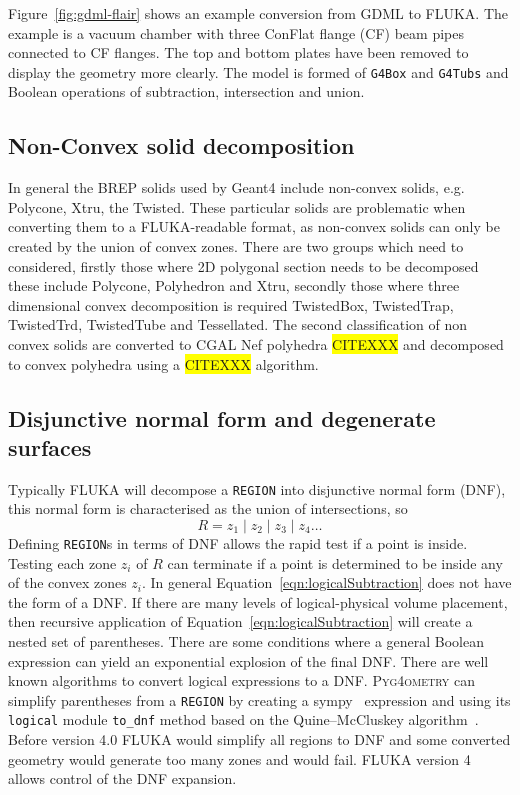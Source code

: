 \documentclass[final,5p,times,twocolumn]{elsarticle}
\newcommand{\PYGEOMETRY}{\textsc{Pyg4ometry}}
\begin{document}
Figure~\ref{fig:gdml-flair} shows an example conversion from GDML to FLUKA. The example is a 
vacuum chamber with three ConFlat flange (CF) beam pipes connected to CF flanges. The top and bottom plates 
have been removed to display the geometry more clearly. The model is formed of \verb|G4Box| and
\verb|G4Tubs| and Boolean operations of subtraction, intersection and union.

\subsection{Non-Convex solid decomposition}
In general the BREP solids used by Geant4 include non-convex solids, e.g. Polycone, Xtru, the Twisted.  These 
particular solids are problematic when converting them to a FLUKA-readable format, as non-convex solids 
can only be created by the union of convex zones. There are two groups which need to considered, firstly those 
where 2D polygonal section needs to be decomposed these include Polycone, Polyhedron and Xtru, secondly 
those where three dimensional convex decomposition is required  TwistedBox, TwistedTrap, TwistedTrd, 
TwistedTube and Tessellated. The second classification of non convex solids are converted to CGAL 
Nef polyhedra \colorbox{yellow}{CITEXXX} and decomposed to convex polyhedra using a 
\colorbox{yellow}{CITEXXX} algorithm. 

\subsection{Disjunctive normal form and degenerate surfaces}
Typically FLUKA will decompose a \verb|REGION| into disjunctive normal form (DNF), this normal form is 
characterised as the union of intersections, so 
\begin{equation}
R = z_1 \; | \;z_2\;  | \; z_3 	\; | \; z_4 \dots
\end{equation}
Defining \verb|REGION|s in terms of DNF allows the rapid test if a point is inside. Testing each zone 
$z_i$ of $R$ can terminate if a point is determined to be inside any of the convex zones $z_i$. In general 
Equation~\ref{eqn:logicalSubtraction} does not have the form of a DNF. If there are many levels of logical-physical volume 
placement, then recursive application of  Equation~\ref{eqn:logicalSubtraction} will create a nested set of 
parentheses. There are some conditions where a general Boolean expression can yield an exponential 
explosion of the final DNF. There are well known algorithms to convert logical expressions to a DNF. 
\PYGEOMETRY{} can simplify parentheses from a \verb|REGION| by creating a sympy~\cite{10.7717/peerj-cs.103} 
expression and using its \verb|logical| module \verb|to_dnf| method based on the Quine–McCluskey algorithm~\cite{6769983}. 
Before version 4.0 FLUKA  would simplify all regions to DNF and some converted geometry would generate 
too many zones and would fail. FLUKA version 4 allows control of the DNF expansion.
\end{document}
